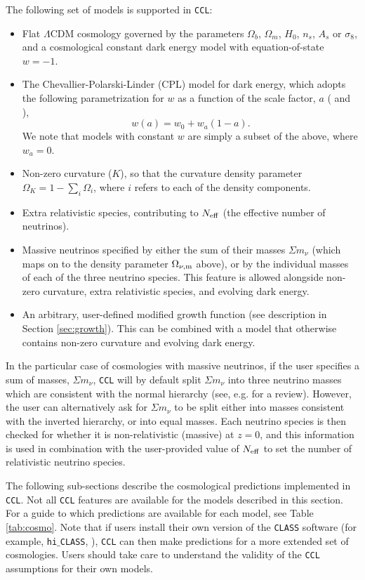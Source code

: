 \documentclass[\docopts]{\docclass}
\newcommand{\ccl}{{\tt CCL}\xspace}
\newcommand{\class}{{\tt CLASS}\xspace}
\newcommand{\hiclass}{{\tt hi$\_$CLASS\xspace}}
\begin{document}
The following set of models is supported in \ccl:
\begin{itemize}
 \item Flat $\Lambda$CDM cosmology governed by the parameters $\Omega_b$, $\Omega_m$, $H_0$, $n_s$, $A_s$ or $\sigma_8$, and a cosmological constant dark energy model with equation-of-state $w=-1$. 
\item The Chevallier-Polarski-Linder (CPL) model for dark energy, which adopts the following parametrization for $w$ as a function of the scale factor, $a$ (\citealt{Chevallier01} and \citealt{Linder03}),
  \begin{equation}
    w(a) = w_0+w_a(1-a).
  \end{equation}
  We note that models with constant $w$ are simply a subset of the above, where $w_a=0$.
 \item Non-zero curvature ($K$), so that the curvature density parameter $\Omega_K = 1 - \sum_i \Omega_i$, where $i$ refers to each of the density components. 
 \item Extra relativistic species, contributing to $N_{\rm eff}$ (the effective number of neutrinos).
  \item Massive neutrinos specified by either the sum of their masses $\Sigma m_\nu$ (which maps on to the density parameter $\Omega_{\nu, {\rm m}}$ above), or by the individual masses of each of the three neutrino species. This feature is allowed alongside non-zero curvature, extra relativistic species, and evolving dark energy.
 \item An arbitrary, user-defined modified growth function (see description in Section \ref{sec:growth}). This can be combined with a model that otherwise contains non-zero curvature and evolving dark energy.
\end{itemize}

In the particular case of cosmologies with massive neutrinos, if the user specifies a sum of masses, $\Sigma m_\nu$, \ccl will by default split $\Sigma m_\nu$ into three neutrino masses which are consistent with the normal hierarchy (see, e.g. \citealt{Gerbino2017} for a review). However, the user can alternatively ask for $\Sigma m_\nu$ to be split either into masses consistent with the inverted hierarchy, or into equal masses. Each neutrino species is then checked for whether it is non-relativistic (massive) at $z=0$, and this information is used in combination with the user-provided value of $N_{\rm eff}$ to set the number of relativistic neutrino species.

The following sub-sections describe the cosmological predictions implemented in \ccl. Not all \ccl features are available for the models described in this section. For a guide to which predictions are available for each model, see Table \ref{tab:cosmo}. Note that if users install their own version of the \class software (for example, \hiclass, \citealt{Zumalacarregui17}), \ccl can then make predictions for a more extended set of cosmologies. Users should take care to understand the validity of the \ccl assumptions for their own models.
\end{document}
